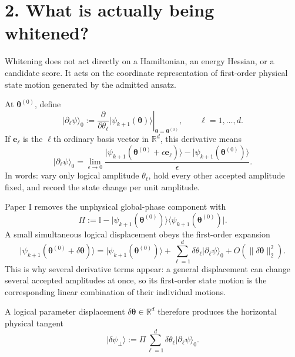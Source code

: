 \documentclass[11pt]{article}
\newcommand{\ket}[1]{\lvert #1\rangle}
\newcommand{\bra}[1]{\langle #1\rvert}
\newcommand{\R}{\mathbb R}
\begin{document}
\section*{2. What is actually being whitened?}

Whitening does not act directly on a Hamiltonian, an energy Hessian, or a
candidate score.  It acts on the coordinate representation of first-order
physical state motion generated by the admitted ansatz.

At \(\boldsymbol\theta^{(0)}\), define
\begin{equation}
\ket{\partial_\ell\psi}_{0}
:=
\left.
\frac{\partial}{\partial\theta_\ell}
\ket{\psi_{k+1}(\boldsymbol\theta)}
\right|_{\boldsymbol\theta=\boldsymbol\theta^{(0)}},
\qquad
\ell=1,\ldots,d.
\label{eq:logical-derivatives}
\end{equation}
If \(\mathbf e_\ell\) is the \(\ell\)th ordinary basis vector in
\(\mathbb R^d\), this derivative means
\begin{equation}
\ket{\partial_\ell\psi}_{0}
=
\lim_{\epsilon\to0}
\frac{
\ket{\psi_{k+1}(\boldsymbol\theta^{(0)}
+\epsilon\mathbf e_\ell)}
-
\ket{\psi_{k+1}(\boldsymbol\theta^{(0)})}
}{\epsilon}.
\label{eq:logical-derivative-limit}
\end{equation}
In words: vary only logical amplitude \(\theta_\ell\), hold every other
accepted amplitude fixed, and record the state change per unit amplitude.

Paper I removes the unphysical global-phase component with
\begin{equation}
\Pi
:=
\mathbb I
-
\ket{\psi_{k+1}(\boldsymbol\theta^{(0)})}
\bra{\psi_{k+1}(\boldsymbol\theta^{(0)})}.
\label{eq:projector}
\end{equation}
A small simultaneous logical displacement obeys the first-order expansion
\begin{equation}
\ket{\psi_{k+1}(\boldsymbol\theta^{(0)}
+\delta\boldsymbol\theta)}
=
\ket{\psi_{k+1}(\boldsymbol\theta^{(0)})}
+
\sum_{\ell=1}^{d}
\delta\theta_\ell\ket{\partial_\ell\psi}_{0}
+
O(\|\delta\boldsymbol\theta\|_2^2).
\label{eq:state-first-order-expansion}
\end{equation}
This is why several derivative terms appear: a general displacement can
change several accepted amplitudes at once, so its first-order state motion is
the corresponding linear combination of their individual motions.

A logical parameter displacement
\(\delta\boldsymbol\theta\in\R^d\) therefore produces the horizontal physical
tangent
\begin{equation}
\ket{\delta\psi_\perp}
:=
\Pi
\sum_{\ell=1}^{d}
\delta\theta_\ell\ket{\partial_\ell\psi}_{0}.
\label{eq:physical-tangent-map}
\end{equation}
\end{document}
